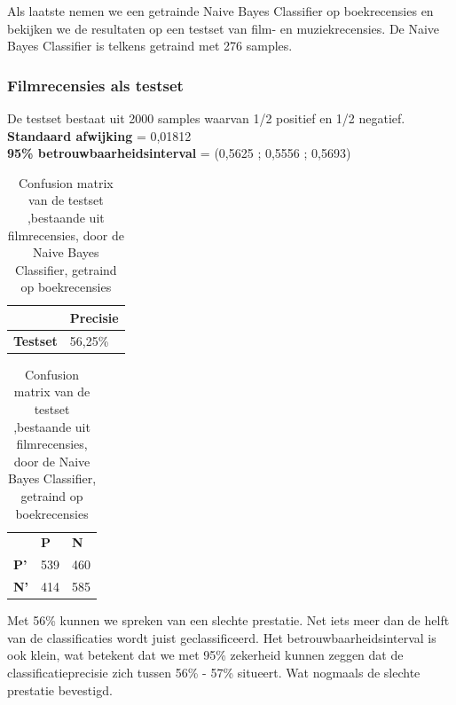 Als laatste nemen we een getrainde Naive Bayes Classifier op boekrecensies en bekijken we de resultaten op een testset van film- en muziekrecensies. De Naive Bayes Classifier is telkens getraind met 276 samples.


\subsubsection{Filmrecensies als testset}\label{Filmrecensies als testset}

De testset bestaat uit 2000 samples waarvan 1/2 positief en 1/2 negatief.\\

\textbf{Standaard afwijking} = 0,01812\\
\textbf{95\% betrouwbaarheidsinterval} = (0,5625 ; 0,5556 ; 0,5693)
 
\begin{table}[h]
\centering
\setlength\tabcolsep{4pt}
\begin{minipage}[t]{0.48\textwidth}
\centering
\begin{tabular}{l|l|}
\cline{2-2}
                                            & \textbf{Precisie} \\ \hline
\multicolumn{1}{|l|}{\textbf{Testset}}      & 56,25\%           \\ \hline
\end{tabular}
\caption{Classificatieprecisie Naive Bayes Classifier, getraind op boekrecensies, getest op filmrecensies}
\end{minipage}%
\hfill
\begin{minipage}[t]{0.48\textwidth}
\centering
\begin{tabular}{lll}
                                 & \textbf{P}               & \textbf{N}               \\ \cline{2-3} 
\multicolumn{1}{l|}{\textbf{P'}} & \multicolumn{1}{l|}{539} & \multicolumn{1}{l|}{460} \\ \cline{2-3} 
\multicolumn{1}{l|}{\textbf{N'}} & \multicolumn{1}{l|}{414} & \multicolumn{1}{l|}{585} \\ \cline{2-3} 
\end{tabular}
\caption{Confusion matrix van de testset ,bestaande uit filmrecensies, door de  Naive Bayes Classifier, getraind op boekrecensies} 
\end{minipage}
\end{table}

Met 56\% kunnen we spreken van een slechte prestatie. Net iets meer dan de helft van de classificaties wordt juist geclassificeerd. Het betrouwbaarheidsinterval is ook klein, wat betekent dat we met 95\% zekerheid kunnen zeggen dat de classificatieprecisie zich tussen 56\% - 57\% situeert. Wat nogmaals de slechte prestatie bevestigd.


